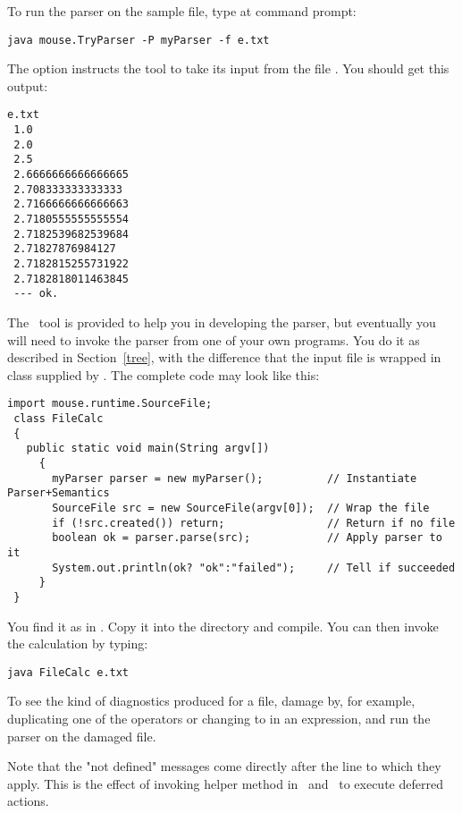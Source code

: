To run the parser on the sample file, type at command prompt:

\small
\begin{Verbatim}[samepage=true,xleftmargin=15mm,baselinestretch=0.8]
 java mouse.TryParser -P myParser -f e.txt
\end{Verbatim}
\normalsize

\newpage
The option  instructs the tool to take its input from
the file .
You should get this output:

\small
\begin{Verbatim}[samepage=true,xleftmargin=15mm,baselinestretch=0.8]
 e.txt
 1.0
 2.0
 2.5
 2.6666666666666665
 2.708333333333333
 2.7166666666666663
 2.7180555555555554
 2.7182539682539684
 2.71827876984127
 2.7182815255731922
 2.7182818011463845
 --- ok.
\end{Verbatim}
\normalsize

The \Mouse\ tool  is provided to help you in developing the parser,
but eventually you will need to invoke the parser from one of your own programs.
You do it as described in Section~\ref{tree}, with the difference that the input file
is wrapped in class  supplied by \Mouse.
The complete code may look like this:

\medskip
\small
\begin{Verbatim}[frame=single,framesep=2mm,samepage=true,xleftmargin=6mm,xrightmargin=6mm,baselinestretch=0.8]
 import mouse.runtime.SourceFile;
 class FileCalc
 {
   public static void main(String argv[])
     {
       myParser parser = new myParser();          // Instantiate Parser+Semantics
       SourceFile src = new SourceFile(argv[0]);  // Wrap the file
       if (!src.created()) return;                // Return if no file
       boolean ok = parser.parse(src);            // Apply parser to it
       System.out.println(ok? "ok":"failed");     // Tell if succeeded
     }
 }
\end{Verbatim}
\normalsize

You find it as  in .
Copy it into the  directory and compile.
You can then invoke the calculation by typing:

\small
\begin{Verbatim}[samepage=true,xleftmargin=15mm,baselinestretch=0.8]
 java FileCalc e.txt
\end{Verbatim}
\normalsize

To see the kind of diagnostics produced for a file, damage 
by, for example, duplicating one of the operators 
or changing  to  in an expression,
and run the parser on the damaged file.

Note that the "not defined" messages come directly after the line
to which they apply.
This is the effect of invoking helper method 
in \Printa\ and \Storea\ to execute deferred actions.

